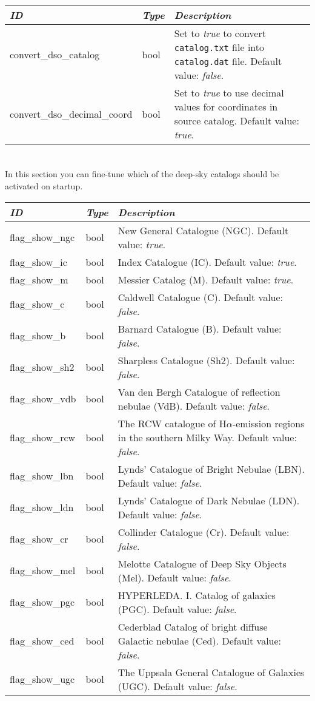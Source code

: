 \section{}
\label{sec:config.ini:devel}

\begin{longtabu} to \textwidth {l|l|X}
\toprule
\emph{ID} & \emph{Type} & \emph{Description}\tabularnewline
\midrule
convert\_dso\_catalog & bool & Set to
\emph{true} to convert \texttt{catalog.txt} file into
\texttt{catalog.dat} file. Default value: \emph{false}.\tabularnewline
\midrule
convert\_dso\_decimal\_coord & bool & Set to
\emph{true} to use decimal values for coordinates in source
catalog. Default value: \emph{true}.\tabularnewline
\bottomrule
\end{longtabu}

\section{}
\label{sec:config.ini:dso_catalog_filters}
In this section you can fine-tune which of the deep-sky catalogs should be activated on startup.

\begin{longtabu} to \textwidth {l|l|X}
\toprule
\emph{ID} & \emph{Type} & \emph{Description}\tabularnewline
\midrule
flag\_show\_ngc & bool & New General Catalogue (NGC). Default value: \emph{true}. \tabularnewline
\midrule
flag\_show\_ic  & bool & Index Catalogue (IC). Default value: \emph{true}. \tabularnewline
\midrule
flag\_show\_m   & bool & Messier Catalog (M). Default value: \emph{true}. \tabularnewline
\midrule
flag\_show\_c   & bool & Caldwell Catalogue (C). Default value: \emph{false}. \tabularnewline
\midrule
flag\_show\_b   & bool & Barnard Catalogue (B). Default value: \emph{false}. \tabularnewline
\midrule
flag\_show\_sh2 & bool & Sharpless Catalogue (Sh2). Default value: \emph{false}. \tabularnewline
\midrule
flag\_show\_vdb & bool & Van den Bergh Catalogue of reflection nebulae (VdB). Default value: \emph{false}. \tabularnewline
\midrule
flag\_show\_rcw & bool & The RCW catalogue of H$\alpha$-emission regions in the southern Milky Way. Default value: \emph{false}. \tabularnewline
\midrule
flag\_show\_lbn & bool & Lynds' Catalogue of Bright Nebulae (LBN). Default value: \emph{false}. \tabularnewline
\midrule
flag\_show\_ldn & bool & Lynds' Catalogue of Dark Nebulae (LDN). Default value: \emph{false}. \tabularnewline
\midrule
flag\_show\_cr  & bool & Collinder Catalogue (Cr). Default value: \emph{false}. \tabularnewline
\midrule
flag\_show\_mel & bool & Melotte Catalogue of Deep Sky Objects (Mel). Default value: \emph{false}. \tabularnewline
\midrule
flag\_show\_pgc & bool & HYPERLEDA. I. Catalog of galaxies (PGC). Default value: \emph{false}. \tabularnewline
\midrule
flag\_show\_ced & bool & Cederblad Catalog of bright diffuse Galactic nebulae (Ced). Default value: \emph{false}. \tabularnewline
\midrule
flag\_show\_ugc & bool & The Uppsala General Catalogue of Galaxies (UGC). Default value: \emph{false}. \tabularnewline
\bottomrule
\end{longtabu}

